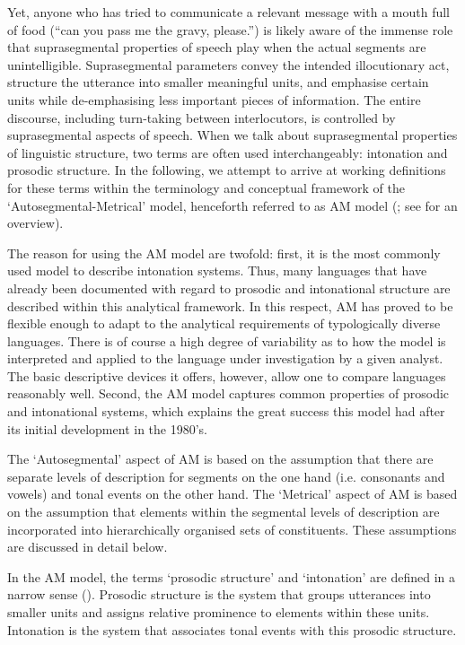 Yet, anyone who has tried to communicate a relevant message with a mouth full of food (“can you pass me the gravy, please.”) is likely aware of the immense role that suprasegmental properties of speech play when the actual segments are unintelligible. Suprasegmental parameters convey the intended illocutionary act, structure the utterance into smaller meaningful units, and emphasise certain units while de-emphasising less important pieces of information. The entire discourse, including turn-taking between interlocutors, is controlled by suprasegmental aspects of speech. When we talk about suprasegmental properties of linguistic structure, two terms are often used interchangeably: intonation and prosodic structure. In the following, we attempt to arrive at working definitions for these terms within the terminology and conceptual framework of the ‘Autosegmental-Metrical’ model, henceforth referred to as AM model (\citealt{Pierr1980}; see \citealt{Ladd2008} for an overview).

The reason for using the AM model are twofold: first, it is the most commonly used model to describe intonation systems. Thus, many languages that have already been documented with regard to prosodic and intonational structure are described within this analytical framework. In this respect, AM has proved to be flexible enough to adapt to the analytical requirements of typologically diverse languages. There is of course a high degree of variability as to how the model is interpreted and applied to the language under investigation by a given analyst. The basic descriptive devices it offers, however, allow one to compare languages reasonably well. Second, the AM model captures common properties of prosodic and intonational systems, which explains the great success this model had after its initial development in the 1980’s.

The ‘Autosegmental’ aspect of AM is based on the assumption that there are separate levels of description for segments on the one hand (i.e. consonants and vowels) and tonal events on the other hand. The ‘Metrical’ aspect of AM is based on the assumption that elements within the segmental levels of description are incorporated into hierarchically organised sets of constituents. These assumptions are discussed in detail below. 

In the AM model, the terms ‘prosodic structure’ and ‘intonation’ are defined in a narrow sense (\citealt{Grice2006,Ladd2008}). Prosodic structure is the system that groups utterances into smaller units and assigns relative prominence to elements within these units. Intonation is the system that associates tonal events with this prosodic structure. 

